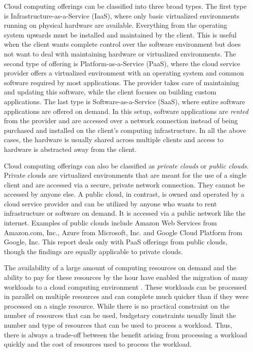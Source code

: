 \documentclass[12pt]{report}
\begin{document}
Cloud computing offerings can be classified into three broad types.
The first type is Infrastructure-as-a-Service (IaaS), where only basic virtualized environments running on physical hardware are available.
Everything from the operating system upwards must be installed and maintained by the client.
This is useful when the client wants complete control over the software environment but does not want to deal with maintaining hardware or virtualized environments.
The second type of offering is Platform-as-a-Service (PaaS), where the cloud service provider offers a virtualized environment with an operating system and common software required by most applications.
The provider takes care of maintaining and updating this software, while the client focuses on building custom applications.
The last type is Software-as-a-Service (SaaS), where entire software applications are offered on demand.
In this setup, software applications are \textit{rented} from the provider and are accessed over a network connection instead of being purchased and installed on the client's computing infrastructure.
In all the above cases, the hardware is usually shared across multiple clients and access to hardware is abstracted away from the client.

Cloud computing offerings can also be classified as \textit{private clouds} or \textit{public clouds}.
Private clouds are virtualized environments that are meant for the use of a single client and are accessed via a secure, private network connection.
They cannot be accessed by anyone else.
A public cloud, in contrast, is owned and operated by a cloud service provider and can be utilized by anyone who wants to rent infrastructure or software on demand.
It is accessed via a public network like the internet.
Examples of public clouds include Amazon Web Services from Amazon.com, Inc., Azure from Microsoft, Inc. and Google Cloud Platform from Google, Inc.
This report deals only with PaaS offerings from public clouds, though the findings are equally applicable to private clouds.

The availability of a large amount of computing resources on demand and the ability to pay for these resources by the hour have enabled the migration of many workloads to a cloud computing environment \cite{RightScale:2015}.
These workloads can be processed in parallel on multiple resources and can complete much quicker than if they were processed on a single resource.
While there is no practical constraint on the number of resources that can be used, budgetary constraints usually limit the number and type of resources that can be used to process a workload.
Thus, there is always a trade-off between the benefit arising from processing a workload quickly and the cost of resources used to process the workload.
\end{document}
